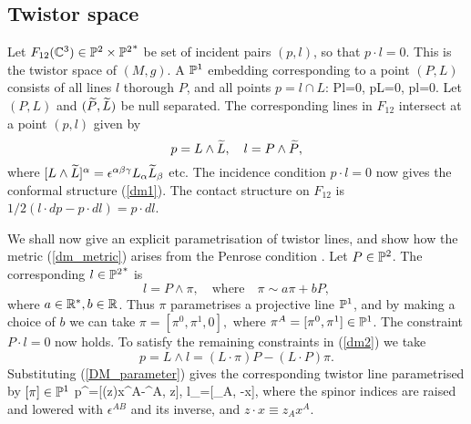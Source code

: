 \subsection{Twistor space}
\label{twist_SSS}
Let $F_{12}(\mathbb{C}^3)\in \mathbb{P}^2\times {\mathbb{P}^2}^*$ be set of incident pairs 
$(p, l)$, so that $p\cdot l=0$. This is the twistor space of $(M, g)$.
A $\mathbb{P}^1$ embedding corresponding to a point $(P, L)$
consists of all lines $l$ thorough $P$, and all points
$p=l\cap L$:
\be
\label{dm2}
P\cdot l=0, \quad p\cdot L=0, \quad p\cdot l=0.
\ee
Let $(P, L)$ and $(\widetilde{P}, \widetilde{L})$ be null separated. The corresponding lines in $F_{12}$
intersect at a point $(p, l)$ given by
\[
p=L\wedge \widetilde{L}, \quad l=P\wedge \widetilde{P},
\]
where $[L\wedge\widetilde{L}]^{\alpha}=\epsilon^{\alpha\beta\gamma}L_{\alpha}\widetilde{L}_{\beta}$ etc.
The incidence condition $p\cdot l=0$ now gives the conformal structure
(\ref{dm1}). The contact structure on $F_{12}$ is $1/2(l\cdot dp-p\cdot dl)=p\cdot dl$.

We shall now give an explicit parametrisation of twistor lines, and show how 
the metric (\ref{dm_metric}) arises from the Penrose condition 
\cite{penrose, ward}.
Let $P\in \mathbb{P}^2$. The corresponding $l\in {\mathbb{P}^2}^*$ is
\[
l=P\wedge \pi, \quad \mbox{where}\quad  \pi\sim a\pi+b P,
\]
where $a\in \mathbb{R}^*, b\in \mathbb{R}$. Thus $\pi$ parametrises a projective line $\mathbb{P}^1$,
and by making a choice of $b$ we can take
$
\pi=[\pi^0, \pi^1, 0], 
$ where $\pi^A=[\pi^0, \pi^1]\in \mathbb{P}^1$. The constraint $P\cdot l=0$ now holds.
To satisfy the remaining constraints in (\ref{dm2}) we take
\[
p=L\wedge l=(L\cdot\pi)P-(L\cdot P)\pi.
\]
Substituting (\ref{DM_parameter}) gives 
the corresponding twistor line parametrised by $[\pi]\in\mathbb{P}^1$ 
\be
\label{sl3curves}
p^{\alpha}=[(z\cdot \pi)x^A-\pi^A, z\cdot \pi], \quad l_\alpha=[\pi_A, -\pi\cdot x],
\ee
where the spinor indices are raised and lowered with $\epsilon^{AB}$ and its inverse, and  $z\cdot x\equiv z_Ax^A$. 

